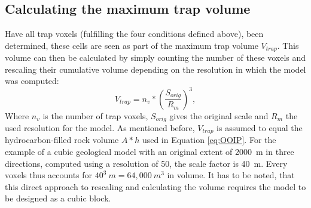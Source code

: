 			\subsection{Calculating the maximum trap volume}
			Have all trap voxels (fulfilling the four conditions defined above), been determined, these cells are seen as part of the maximum trap volume $V_{trap}$. This volume can then be calculated by simply counting the number of these voxels and rescaling their cumulative volume depending on the resolution in which the model was computed:
			\begin{equation}
			V_{trap} = n_v*(\frac{S_{orig}}{R_{m}})^3,
			\end{equation}
			Where $n_v$ is the number of trap voxels, $S_{orig}$ gives the original scale and $R_m$ the used resolution for the model. As mentioned before, $V_{trap}$ is assumed to equal the hydrocarbon-filled rock volume $A * h$ used in Equation \ref{eq:OOIP}. 
			For the example of a cubic geological model with an original extent of 2000~m in three directions, computed using a resolution of 50, the scale factor is 40~m. Every voxels thus accounts for $40^3~m=64,000~m^3$ in volume. It has to be noted, that this direct approach to rescaling and calculating the volume requires the model to be designed as a cubic block.\\
		
